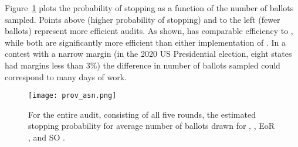 Figure~\ref{fig:prov-asn} plots the probability of stopping as a function of the number of ballots sampled. Points above (higher probability of stopping) and to the left (fewer ballots) represent more efficient audits. As shown, \Providence has comparable efficiency to \Minerva, while both are significantly more efficient than either implementation of \BRAVO. In a contest with a narrow margin (in the 2020 US Presidential election, eight states had margins less than $3\%$) the difference in number of ballots sampled could correspond to many days of work. 

\begin{figure}
\texttt{[image: prov\_asn.png]}
\caption{For the entire audit, consisting of all five rounds, the estimated stopping probability for average number of ballots drawn for \Providence, \Minerva, EoR \BRAVO, and SO \BRAVO.}
\label{fig:prov-asn}
\end{figure}








